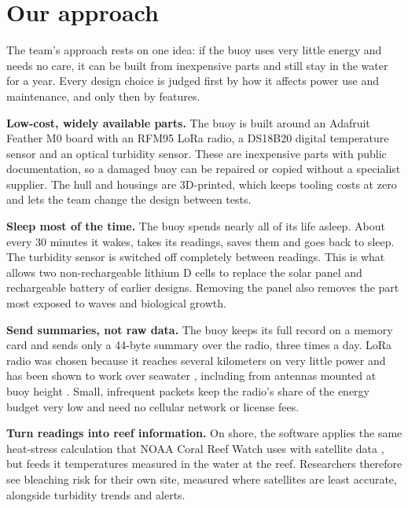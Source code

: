 \section{Our approach} %

The team's approach rests on one idea: if the buoy uses very little energy and needs no care, it can be built from inexpensive parts and still stay in the water for a year. Every design choice is judged first by how it affects power use and maintenance, and only then by features.

\textbf{Low-cost, widely available parts.} The buoy is built around an Adafruit Feather M0 board with an RFM95 LoRa radio, a DS18B20 digital temperature sensor and an optical turbidity sensor. These are inexpensive parts with public documentation, so a damaged buoy can be repaired or copied without a specialist supplier. The hull and housings are 3D-printed, which keeps tooling costs at zero and lets the team change the design between tests.

\textbf{Sleep most of the time.} The buoy spends nearly all of its life asleep. About every 30 minutes it wakes, takes its readings, saves them and goes back to sleep. The turbidity sensor is switched off completely between readings. This is what allows two non-rechargeable lithium D cells to replace the solar panel and rechargeable battery of earlier designs. Removing the panel also removes the part most exposed to waves and biological growth.

\textbf{Send summaries, not raw data.} The buoy keeps its full record on a memory card and sends only a 44-byte summary over the radio, three times a day. LoRa radio was chosen because it reaches several kilometers on very little power and has been shown to work over seawater \cite{jovalekic2018}, including from antennas mounted at buoy height \cite{parri2019}. Small, infrequent packets keep the radio's share of the energy budget very low and need no cellular network or license fees.

\textbf{Turn readings into reef information.} On shore, the software applies the same heat-stress calculation that NOAA Coral Reef Watch uses with satellite data \cite{liu2014}, but feeds it temperatures measured in the water at the reef. Researchers therefore see bleaching risk for their own site, measured where satellites are least accurate, alongside turbidity trends and alerts.

